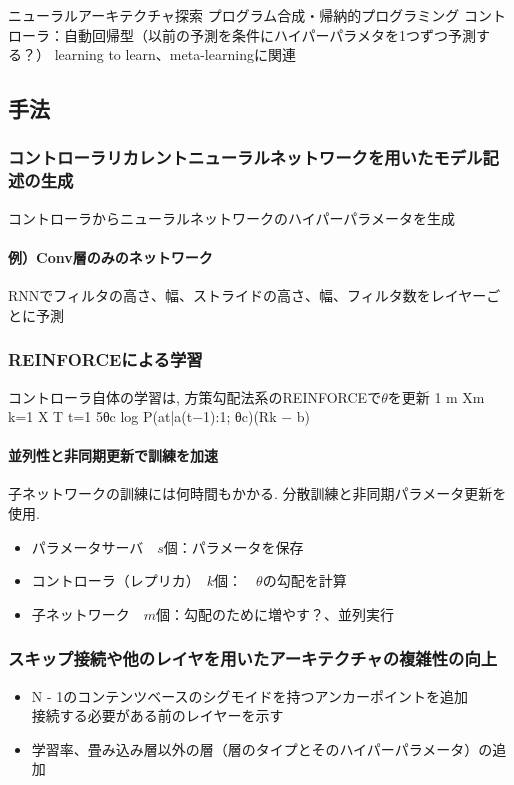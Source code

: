\documentclass[twocolumn]{jarticle}     %
\begin{document}
ニューラルアーキテクチャ探索
プログラム合成・帰納的プログラミング
コントローラ：自動回帰型（以前の予測を条件にハイパーパラメタを1つずつ予測する？）
learning to learn、meta-learningに関連

\subsection{手法}
\subsubsection{コントローラリカレントニューラルネットワークを用いたモデル記述の生成}
コントローラからニューラルネットワークのハイパーパラメータを生成\\

\paragraph{例）Conv層のみのネットワーク\\}
RNNでフィルタの高さ、幅、ストライドの高さ、幅、フィルタ数をレイヤーごとに予測\\

\subsubsection{REINFORCEによる学習}
コントローラ自体の学習は, 方策勾配法系のREINFORCEで$\theta$を更新
1 m Xm k=1 X T t=1 5θc log P(at|a(t−1):1; θc)(Rk − b)

\paragraph{並列性と非同期更新で訓練を加速}
子ネットワークの訓練には何時間もかかる.
分散訓練と非同期パラメータ更新を使用.
\begin{itemize}
  \item パラメータサーバ　$s$個：パラメータを保存
  \item コントローラ（レプリカ）　$k$個：　$\theta$の勾配を計算
  \item 子ネットワーク　$m$個：勾配のために増やす？、並列実行
\end{itemize}

\subsubsection{スキップ接続や他のレイヤを用いたアーキテクチャの複雑性の向上}
\begin{itemize}
  \item N - 1のコンテンツベースのシグモイドを持つアンカーポイントを追加\\
        接続する必要がある前のレイヤーを示す
  \item 学習率、畳み込み層以外の層（層のタイプとそのハイパーパラメータ）の追加
\end{itemize}
\end{document}
